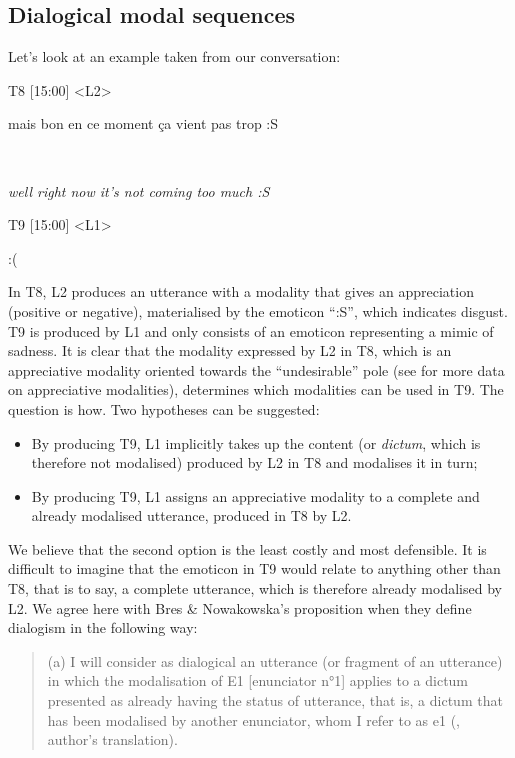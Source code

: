 \documentclass[output=paper]{langscibook}
\begin{document}
\subsection{Dialogical modal sequences}

Let's look at an example taken from our conversation: 

\ea 
\ttfamily

\parbox{30mm}{T8 [15:00] <L2>}mais bon en ce moment ça vient pas trop :S\\
\parbox{30mm}{~}\textsl{well right now it's not coming too much :S}\medskip

\parbox{30mm}{T9 [15:00] <L1>}:(\\
 
\z 

In T8, L2 produces an utterance with a modality that gives an appreciation (positive or negative), materialised by the emoticon “:S”, which indicates disgust. T9 is produced by L1 and only consists of an emoticon representing a mimic of sadness. It is clear that the modality expressed by L2 in T8, which is an appreciative modality oriented towards the “undesirable” pole (see \citealt{Gosselin2010} for more data on appreciative modalities), determines which modalities can be used in T9. The question is how. Two hypotheses can be suggested: 

\begin{itemize}

\item By producing T9, L1 implicitly takes up the content (or \textit{dictum}, which is therefore not modalised) produced by L2 in T8 and modalises it in turn; 

\item By producing T9, L1 assigns an appreciative modality to a complete and already modalised utterance, produced in T8 by L2.

\end{itemize}

We believe that the second option is the least costly and most defensible. It is difficult to imagine that the emoticon in T9 would relate to anything other than T8, that is to say, a complete utterance, which is therefore already modalised by L2. We agree here with Bres \& Nowakowska’s proposition when they define dialogism in the following way:

\begin{quote}
(a) I will consider as dialogical an utterance (or fragment of an utterance) in which the modalisation of E1 [enunciator n°1] applies to a dictum presented as already having the status of utterance, that is, a dictum that has been modalised by another enunciator, whom I refer to as e1 (\citealt[72]{Bres1999}, author’s translation).
\end{quote}
\end{document}
